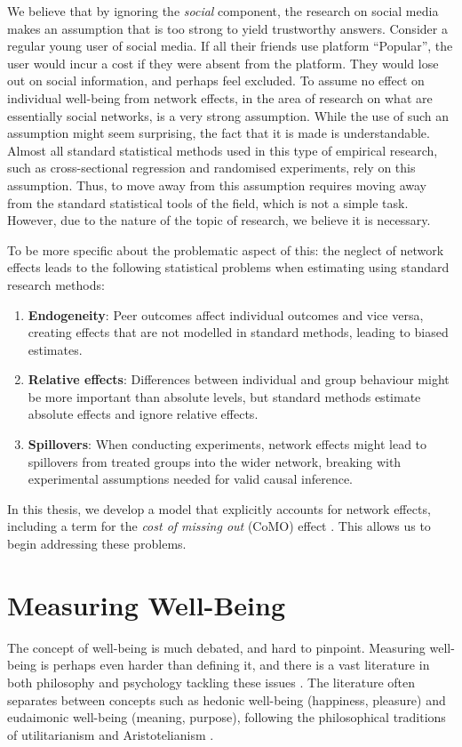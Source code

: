 We believe that by ignoring the \emph{social} component, the research on social media makes an assumption that is too strong to yield trustworthy answers. Consider a regular young user of social media. If all their friends use platform ``Popular'', the user would incur a cost if they were absent from the platform. They would lose out on social information, and perhaps feel excluded. To assume no effect on individual well-being from network effects, in the area of research on what are essentially social networks, is a very strong assumption. While the use of such an assumption might seem surprising, the fact that it is made is understandable. Almost all standard statistical methods used in this type of empirical research, such as cross-sectional regression and randomised experiments, rely on this assumption. Thus, to move away from this assumption requires moving away from the standard statistical tools of the field, which is not a simple task. However, due to the nature of the topic of research, we believe it is necessary.

To be more specific about the problematic aspect of this: the neglect of network effects leads to the following statistical problems when estimating using standard research methods:

\begin{enumerate}
    \item \textbf{Endogeneity}: Peer outcomes affect individual outcomes and vice versa, creating effects that are not modelled in standard methods, leading to biased estimates.
    \item \textbf{Relative effects}: Differences between individual and group behaviour might be more important than absolute levels, but standard methods estimate absolute effects and ignore relative effects.
    \item \textbf{Spillovers}: When conducting experiments, network effects might lead to spillovers from treated groups into the wider network, breaking with experimental assumptions needed for valid causal inference.
\end{enumerate}

In this thesis, we develop a model that explicitly accounts for network effects, including a term for the \emph{cost of missing out} (CoMO) effect \parencite[Eqs.~1--2]{DahlFoldnesGronneberg2024}. This allows us to begin addressing these problems.

\section{Measuring Well-Being}
\label{sec:intro:wb_measurement}
The concept of well-being is much debated, and hard to pinpoint. Measuring well-being is perhaps even harder than defining it, and there is a vast literature in both philosophy and psychology tackling these issues \parencite{Ryan2001, Diener1984, LayardDeNeve2023}. The literature often separates between concepts such as hedonic well-being (happiness, pleasure) and eudaimonic well-being (meaning, purpose), following the philosophical traditions of utilitarianism and Aristotelianism \parencite{Ryan2001}.

